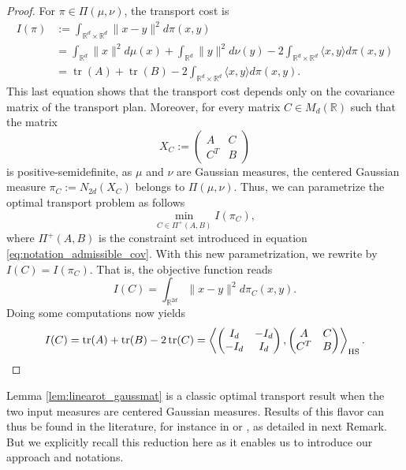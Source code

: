 \documentclass[]{article}
\DeclareMathOperator{\tr}{tr}
\numberwithin{equation}{section}
\theoremstyle{plain}
\begin{document}
\begin{proof}
	For $\pi \in \Pi(\mu, \nu)$, the transport cost is
	\begin{align*}
		I(\pi) & :=\int_{\mathbb{R}^d \times  \mathbb{R}^d} \|x-y\|^2 d\pi(x,y)\\
		&  = \int_{\mathbb{R}^d} \|x\|^2 d\mu(x) + \int_{\mathbb{R}^d} \|y\|^2 d\nu(y) - 2 \int_{\mathbb{R}^d \times \mathbb{R}^d} \langle x, y \rangle  d\pi(x,y)\\
		& = \tr(A) + \tr(B) - 2 \int_{\mathbb{R}^d \times \mathbb{R}^d} \langle x, y \rangle  d\pi(x,y).
	\end{align*}
	This last equation shows that the transport cost depends only on the covariance matrix of the transport plan. Moreover, for every matrix $C \in M_d(\mathbb{R})$ such that the matrix 
	\begin{equation*}
		X_C := \begin{pmatrix}
			A & C \\
			C^T & B 	
		\end{pmatrix}
	\end{equation*}
	 is positive-semidefinite, as $\mu$ and $\nu$ are Gaussian measures, the centered Gaussian measure $\pi_C := N_{2d}(X_C)$ belongs to $\Pi(\mu, \nu)$. Thus, we can parametrize the optimal transport problem as follows 
	\begin{equation}
		\min_{C \in \Pi^+(A,B)} I(\pi_C),
	\end{equation}
	where $\Pi^+(A,B)$ is the constraint set introduced in equation \eqref{eq:notation_admissible_cov}. With this new parametrization, we rewrite by $I(C) = I(\pi_C)$. That is, the objective function reads
	\begin{equation}
		I(C) =  \int_{\mathbb{R}^{2d}} \| x - y\|^2 d \pi_C(x,y).
	\end{equation}
	Doing some computations now yields 
	\begin{equation}
		I(C) = \tr(A) + \tr(B) - 2 \tr(C) = \left\langle \begin{pmatrix}
			I_d & -I_d \\
			-I_d & I_d
		\end{pmatrix}, \begin{pmatrix}
			A & C \\
			C^T & B
		\end{pmatrix}\right \rangle_{\rm HS}. 
	\end{equation}
\end{proof}



Lemma \ref{lem:linearot_gaussmat} is a classic optimal transport result when the two input measures are centered Gaussian measures. Results of this flavor can thus be found in the literature, for instance in  \cite{bhatia2019bures} or \cite[Sec.~1.6.3]{panaretos2020invitation}, as detailed in next Remark. But we explicitly recall this reduction here as it enables us to introduce our approach and notations.  
\end{document}
